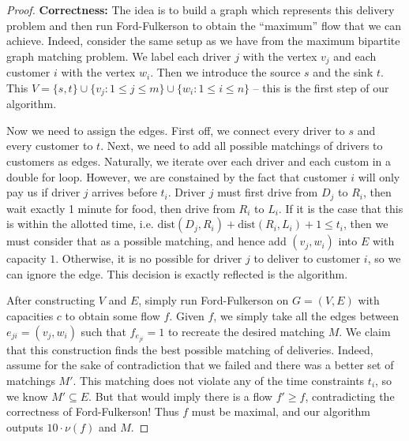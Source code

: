 \documentclass[10pt]{article}
\begin{document}
\begin{proof}
  \textbf{Correctness:} The idea is to build a graph which represents this delivery problem and then run Ford-Fulkerson to obtain the ``maximum'' flow that we can achieve. Indeed, consider the same setup as we have from the maximum bipartite graph matching problem. We label each driver \(j\) with the vertex \(v_j\) and each customer \(i\) with the vertex \(w_i\). Then we introduce the source \(s\) and the sink \(t\). This \(V = \{s, t\} \cup \{v_j : 1 \leq j \leq m\} \cup \{w_i : 1 \leq i \leq n\}\) -- this is the first step of our algorithm.

  Now we need to assign the edges. First off, we connect every driver to \(s\) and every customer to \(t\). Next, we need to add all possible matchings of drivers to customers as edges. Naturally, we iterate over each driver and each custom in a double for loop. However, we are constained by the fact that customer \(i\) will only pay us if driver \(j\) arrives before \(t_i\). Driver \(j\) must first drive from \(D_j\) to \(R_i\), then wait exactly 1 minute for food, then drive from \(R_i\) to \(L_i\).  If it is the case that this is within the allotted time, i.e. \(\text{dist}(D_j, R_i) + \text{dist}(R_i, L_i) + 1 \leq t_i\), then we must consider that as a possible matching, and hence add \((v_j, w_i)\) into \(E\) with capacity \(1\). Otherwise, it is no possible for driver \(j\) to deliver to customer \(i\), so we can ignore the edge. This decision is exactly reflected is the algorithm.

  After constructing \(V\) and \(E\), simply run Ford-Fulkerson on \(G = (V, E)\) with capacities \(c\) to obtain some flow \(f\). Given \(f\), we simply take all the edges between \(e_{ji} = (v_j, w_i)\) such that \(f_{e_{ji}} = 1\) to recreate the desired matching \(M\). We claim that this construction finds the best possible matching of deliveries. Indeed, assume for the sake of contradiction that we failed and there was a better set of matchings \(M'\). This matching does not violate any of the time constraints \(t_i\), so we know \(M' \subseteq E\). But that would imply there is a flow \(f' \geq f\), contradicting the correctness of Ford-Fulkerson! Thus \(f\) must be maximal, and our algorithm outputs \(10 \cdot \nu(f)\) and \(M\).


\end{proof}
\end{document}
